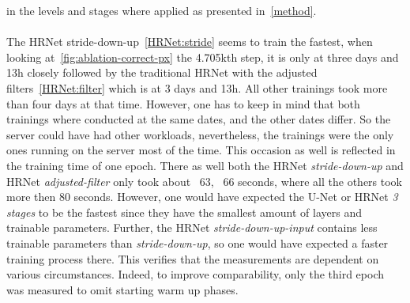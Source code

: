 in the levels and stages where applied as presented in~\autoref{method}.
\\\mbox{}\\
The HRNet stride-down-up~\ref{HRNet:stride} seems to train the fastest, when looking at~\ref{fig:ablation-correct-px}
the
4.705kth step, it is only at three days and 13h closely followed by the traditional HRNet with the adjusted
filters~\ref{HRNet:filter}
which is at 3 days and 13h. All other trainings took more than four days at that time.
However, one has to keep in mind that both trainings where conducted at the same dates, and the other dates differ.
So the server could have had other workloads, nevertheless, the trainings were the only ones running on the server most
of the time. This occasion as well is reflected in the training time of one epoch.
There as well both the HRNet \textit{stride-down-up} and HRNet \textit{adjusted-filter} only took about ~63, ~66
seconds,
where all the others took more then 80 seconds.
However, one would have expected the U-Net or HRNet \textit{3 stages} to be the fastest since they have the smallest
amount of layers and trainable parameters.
Further, the HRNet \textit{stride-down-up-input} contains less trainable parameters than \textit{stride-down-up}, so
one would have expected a faster training process there.
This verifies that the measurements are dependent on various circumstances.
Indeed, to improve comparability, only the third epoch was measured to omit starting warm up phases.

